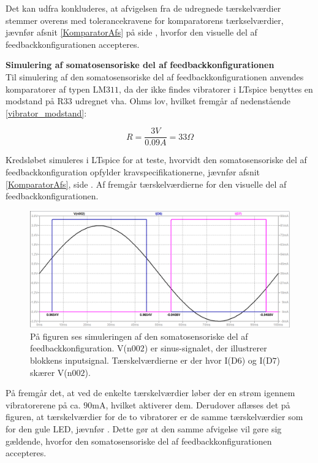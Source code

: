 \noindent Det kan udfra  konkluderes, at afvigelsen fra de udregnede tærskelværdier stemmer overens med tolerancekravene for komparatorens tærkselværdier, jævnfør afsnit \ref{KomparatorAfs} på side \pageref{KomparatorAfs}, hvorfor den visuelle del af feedbackkonfigurationen accepteres. 

\noindent\textbf{Simulering af somatosensoriske del af feedbackkonfigurationen} \\
Til simulering af den somatosensoriske del af feedbackkonfigurationen anvendes komparatorer af typen LM$311$, da der ikke findes vibratorer i LTspice benyttes en modstand på R$33$ udregnet vha. Ohms lov, hvilket fremgår af nedenstående \eqref{vibrator_modstand}:

\begin{equation} \label{vibrator_modstand}
R = \dfrac{3V}{0.09A} = 33\Omega
\end{equation}

\noindent Kredsløbet simuleres i LTspice for at teste, hvorvidt den somatosensoriske del af feedbackkonfiguration opfylder kravspecifikationerne, jævnfør afsnit \ref{KomparatorAfs}, side \pageref{KomparatorAfs}. Af  fremgår tærskelværdierne for den visuelle del af feedbackkonfigurationen.

\begin{figure}[H]
	\centering
	\includegraphics[scale=0.36]{figures/cProblemloesning/vibration_graf.PNG}
	\caption{På figuren ses simuleringen af den somatosensoriske del af feedbackkonfiguration. V(n$002$) er sinus-signalet, der illustrerer blokkens inputsignal. Tærskelværdierne er der hvor I(D$6$) og I(D$7$) skærer V(n$002$).}
	\label{fig:vibration_graf}
\end{figure}
\noindent På  fremgår det, at ved de enkelte tærskelværdier løber der en strøm igennem vibratorerene på ca. $90$mA, hvilket aktiverer dem. Derudover aflæses det på figuren, at tærskelværdier for de to vibratorer er de samme tærskelværdier som for den gule LED, jævnfør . Dette gør at den samme afvigelse vil gøre sig gældende, hvorfor den somatosensoriske del af feedbackkonfigurationen accepteres. 

